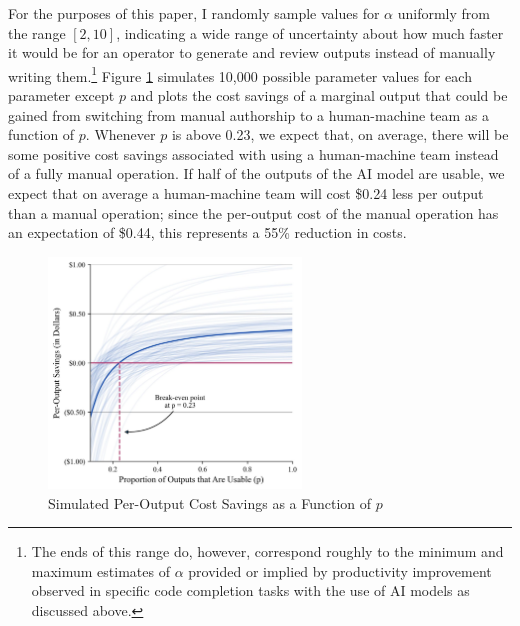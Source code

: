 \documentclass{article}
\begin{document}
For the purposes of this paper, I randomly sample values for $\alpha$ uniformly from the range $[2, 10]$, indicating a wide range of uncertainty about how much faster it would be for an operator to generate and review outputs instead of manually writing them.\footnote{The ends of this range do, however, correspond roughly to the minimum and maximum estimates of $\alpha$ provided or implied by productivity improvement observed in specific code completion tasks with the use of AI models as discussed above.} Figure \ref{fig:costsavings} simulates 10,000 possible parameter values for each parameter except $p$ and plots the cost savings of a marginal output that could be gained from switching from manual authorship to a human-machine team as a function of $p$. Whenever $p$ is above 0.23, we expect that, on average, there will be some positive cost savings associated with using a human-machine team instead of a fully manual operation. If half of the outputs of the AI model are usable, we expect that on average a human-machine team will cost \$0.24 less per output than a manual operation; since the per-output cost of the manual operation has an expectation of \$0.44, this represents a 55\% reduction in costs. 

\begin{figure}[h]
  \centering
  \includegraphics[width=0.6\textwidth]{figures/p.jpg}
  \caption{Simulated Per-Output Cost Savings as a Function of $p$}
  \label{fig:costsavings}
\end{figure}
\end{document}
